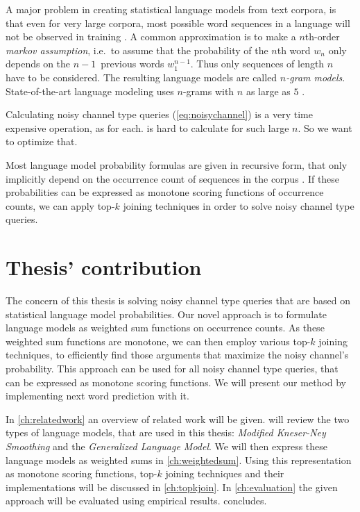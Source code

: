 A major problem in creating statistical language models from text corpora, is
that even for very large corpora, most possible word sequences in a language
will not be observed in training \noref.
A common approximation is to make a $n$th-order \emph{markov assumption},
i.e.\ to assume that the probability of the $n$th word $w_n$ only depends on
the $n\!-\!1$~previous words $w_1^{n-1}$.
Thus only sequences of length $n$ have to be considered.
The resulting language models are called \emph{$n$-gram models}.
State-of-the-art language modeling uses $n$-grams with $n$ as large as $5$
\parencite{JurafskyMartin2009,Goodman2001,Stolcke2000}.

\begin{draft}
Calculating noisy channel type queries (\cref{eq:noisychannel}) is a very time
expensive operation, as for each.
 is hard to calculate for such large $n$.
So we want to optimize that.
\end{draft}

Most language model probability formulas are given in recursive form, that only
implicitly depend on the occurrence count of sequences in the corpus \noref.
If these probabilities can be expressed as monotone scoring functions of
occurrence counts, we can apply top-$k$ joining techniques in order to solve
noisy channel type queries.

\section{Thesis' contribution}

The concern of this thesis is solving noisy channel type queries that are based
on statistical language model probabilities.
Our novel approach is to formulate language models as weighted sum functions on
occurrence counts.
As these weighted sum functions are monotone, we can then employ various
top-$k$ joining techniques, to efficiently find those arguments that maximize
the noisy channel's probability.
This approach can be used for all noisy channel type queries, that can be
expressed as monotone scoring functions.
We will present our method by implementing next word prediction with it.

In \cref{ch:relatedwork} an overview of related work will be given.
 will review the two types of language models, that are used in
this thesis: \emph{Modified Kneser-Ney Smoothing} and the \emph{Generalized
Language Model}.
We will then express these language models as weighted sums in
\cref{ch:weightedsum}.
Using this representation as monotone scoring functions, top-$k$ joining
techniques and their implementations will be discussed in \cref{ch:topkjoin}.
In \cref{ch:evaluation} the given approach will be evaluated using empirical
results.
 concludes.
